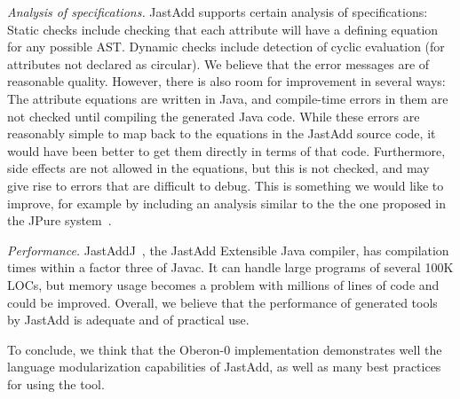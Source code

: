 \emph{Analysis of specifications.}
JastAdd supports certain analysis of specifications: Static checks include checking that each attribute will have a defining equation for any possible AST. Dynamic checks include detection of cyclic evaluation (for attributes not declared as circular). We believe that the error messages are of reasonable quality. However, there is also room for improvement in several ways: The attribute equations are written in Java, and compile-time errors in them are not checked until compiling the generated Java code. While these errors are reasonably simple to map back to the equations in the JastAdd source code, it would have been better to get them directly in terms of that code. Furthermore, side effects are not allowed in the equations, but this is not checked, and may give rise to errors that are difficult to debug. This is something we would like to improve, for example by including an analysis similar to the the one proposed in the JPure system~\cite{pearce11cc}.

\emph{Performance.} JastAddJ~\cite{ekman07oopsla}, the JastAdd Extensible Java compiler, has compilation times within a factor three of Javac. It can handle large programs of several 100K LOCs, but memory usage becomes a problem with millions of lines of code and could be improved. Overall, we believe that the performance of generated tools by JastAdd is adequate and of practical use. 

To conclude, we think that the Oberon-0 implementation demonstrates well the language modularization capabilities of JastAdd, as well as many best practices for using the tool.